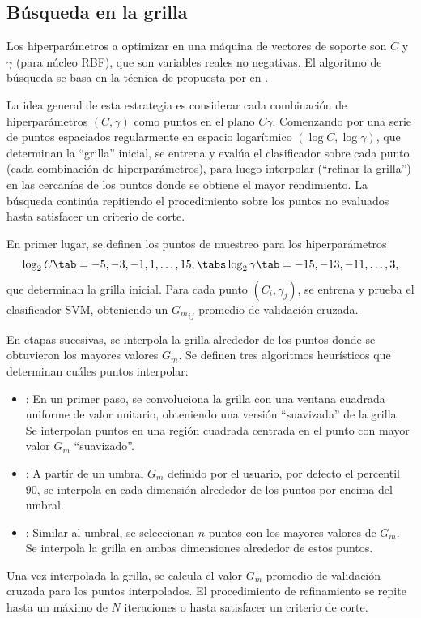 %
%
\subsection{Búsqueda en la grilla}
%
Los hiperparámetros a optimizar en una máquina de vectores de soporte
son $C$ y $\gamma$ (para núcleo RBF), que son variables reales no
negativas. El algoritmo de búsqueda se basa en la técnica de
 propuesta por \citeauthor{hsu} en
\cite{hsu}.

La idea general de esta estrategia es considerar cada combinación de
hiperparámetros $(C,\gamma)$ como puntos en el plano
$C\gamma$. Comenzando por una serie de puntos espaciados regularmente
en espacio logarítmico $(\log C,\log\gamma)$, que determinan la
``grilla'' inicial, se entrena y evalúa el clasificador sobre cada
punto (cada combinación de hiperparámetros), para luego interpolar
(``refinar la grilla'') en las cercanías de los puntos donde se
obtiene el mayor rendimiento. La búsqueda continúa repitiendo el
procedimiento sobre los puntos no evaluados hasta satisfacer un
criterio de corte.

En primer lugar, se definen los puntos de muestreo para los
hiperparámetros
%
\begin{align}
  \label{initial-grid}
  \log_2 C     \tab= -5, -3, -1, 1, \ldots, 15, \tabs
  \log_2\gamma \tab= -15,-13, -11, \ldots, 3,
\end{align}
%
que determinan la grilla inicial. Para cada punto $(C_i,\gamma_j)$, se
entrena y prueba el clasificador SVM, obteniendo un ${G_m}_{ij}$
promedio de validación cruzada.

En etapas sucesivas, se interpola la grilla alrededor de los puntos
donde se obtuvieron los mayores valores $G_m$. Se definen tres
algoritmos heurísticos que determinan cuáles puntos interpolar:
%
\begin{itemize}
%
\item {}: En un primer paso, se convoluciona la grilla con una
  ventana cuadrada uniforme de valor unitario, obteniendo una versión
  ``suavizada'' de la grilla. Se interpolan puntos en una región
  cuadrada centrada en el punto con mayor valor $G_m$ ``suavizado''.
%
\item {}: A partir de un umbral $G_m$ definido por el usuario,
  por defecto el percentil 90, se interpola en cada dimensión
  alrededor de los puntos por encima del umbral.
%
\item {}: Similar al umbral, se seleccionan $n$ puntos
  con los mayores valores de $G_m$. Se interpola la grilla en ambas
  dimensiones alrededor de estos puntos.
%
\end{itemize}
%
Una vez interpolada la grilla, se calcula el valor $G_m$ promedio de
validación cruzada para los puntos interpolados. El procedimiento de
refinamiento se repite hasta un máximo de $N$ iteraciones o hasta
satisfacer un criterio de corte.

